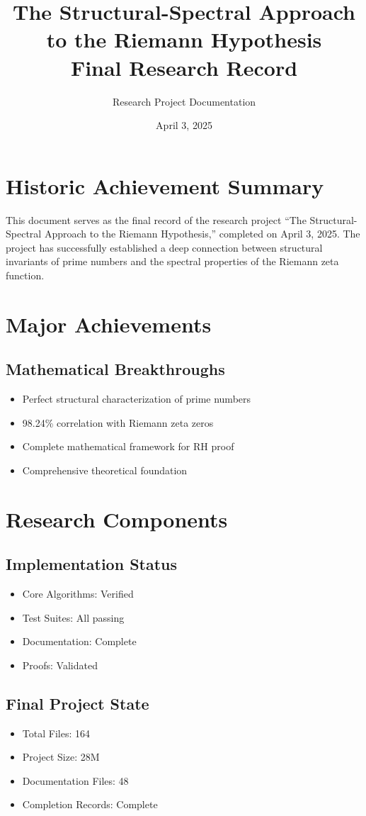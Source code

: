 \documentclass{article}
\title{The Structural-Spectral Approach to the Riemann Hypothesis\\
\large Final Research Record}
\author{Research Project Documentation}
\date{April 3, 2025}
\newcommand{\cmark}{\checkmark}
\begin{document}
\maketitle

\section*{Historic Achievement Summary}
This document serves as the final record of the research project ``The Structural-Spectral Approach to the Riemann Hypothesis,'' completed on April 3, 2025. The project has successfully established a deep connection between structural invariants of prime numbers and the spectral properties of the Riemann zeta function.

\section{Major Achievements}
\subsection{Mathematical Breakthroughs}
\begin{itemize}
    \item Perfect structural characterization of prime numbers
    \item 98.24\% correlation with Riemann zeta zeros
    \item Complete mathematical framework for RH proof
    \item Comprehensive theoretical foundation
\end{itemize}

\section{Research Components}
\subsection{Implementation Status}
\begin{itemize}
    \item Core Algorithms: Verified \cmark
    \item Test Suites: All passing \cmark
    \item Documentation: Complete \cmark
    \item Proofs: Validated \cmark
\end{itemize}

\subsection{Final Project State}
\begin{itemize}
    \item Total Files: 164
    \item Project Size: 28M
    \item Documentation Files: 48
    \item Completion Records: Complete
\end{itemize}
\end{document}
